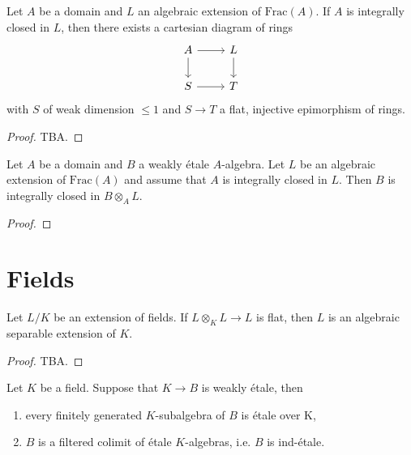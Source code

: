 \begin{lemma}[\stacksproject{092U}]
    Let $A$ be a domain and $L$ an algebraic extension of $\mathrm{Frac}(A)$.
    If $A$ is integrally closed in $L$, then there exists a cartesian diagram
    of rings
    \[
    \begin{tikzcd}
        A \arrow{r} \arrow{d} & L \arrow{d} \\
        S \arrow{r} & T
    \end{tikzcd}
    \] with $S$ of weak dimension $\le 1$ and $S \to T$ a flat, injective epimorphism of rings.
    \label{lemma:integrally-closed-cartesian-weak-dim}
\end{lemma}

\begin{proof}
    TBA.
\end{proof}

\begin{lemma}[\stacksproject{092W}]
    Let $A$ be a domain and $B$ a weakly étale $A$-algebra. Let $L$ be an algebraic extension
    of $\mathrm{Frac}(A)$ and assume that $A$ is integrally closed in $L$.
    Then $B$ is integrally closed
    in $B \otimes_{A} L$.
    \label{lemma:weakly-etale-integrally-closed}
\end{lemma}

\begin{proof}
\end{proof}

\section{Fields}

\begin{lemma}[\stacksproject{092P}]
    \label{lem:flat-tensor-over-field-imples-algebraic}
    Let $L/K$ be an extension of fields. If $L \otimes_K L \to L$ is flat, then $L$ is an algebraic
    separable extension of $K$.
    \leanok
\end{lemma}

\begin{proof}
    TBA.
\end{proof}

\begin{theorem}[\stacksproject{092Q}, (2) => (3) and last part]
    \label{thm:weakly-etale-imples-ind-etale-over-fields}
    Let $K$ be a field. Suppose that $K \to B$ is weakly étale, then
    \begin{enumerate}
        \item every finitely generated $K$-subalgebra of $B$ is étale over K,
        \item $B$ is a filtered colimit of
    étale $K$-algebras, i.e. $B$ is ind-\'etale.
    \end{enumerate}
    \leanok
\end{theorem}

